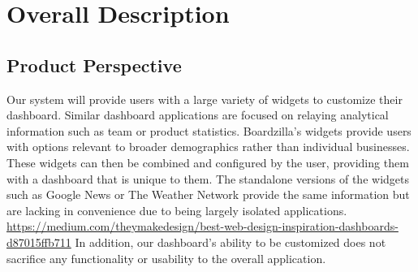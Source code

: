 \documentclass[]{article}
\begin{document}

\section{Overall Description}
\label{sec:overall_description}


\subsection{Product Perspective}
\label{sub:product_perspective}
Our system will provide users with a large variety of widgets to customize their dashboard. Similar dashboard applications are focused on relaying analytical information such as team or product statistics. Boardzilla's widgets provide users with options relevant to broader demographics rather than individual businesses. These widgets can then be combined and configured by the user, providing them with a dashboard that is unique to them. The standalone versions of the widgets such as Google News or The Weather Network provide the same information but are lacking in convenience due to being largely isolated applications. \url{https://medium.com/theymakedesign/best-web-design-inspiration-dashboards-d87015ffb711} In addition, our dashboard's ability to be customized does not sacrifice any functionality or usability to the overall application.
\begin{enumerate}[a)]
  
\end{enumerate}
\end{document}
